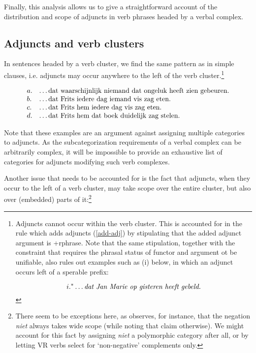 Finally, this analysis allows us to give a straightforward account of the
distribution and scope of adjuncts in verb phrases headed by a verbal complex.

\subsection{Adjuncts and verb clusters}

In sentences headed by a verb cluster, we find the same pattern as in simple 
clauses, i.e. adjuncts may occur anywhere to the left of the verb 
cluster.\footnote{Adjuncts cannot occur within the verb cluster. This is 
accounted for in the rule which adds adjuncts (\ref{add-adj}) by stipulating 
that the added adjunct argument is {\sc +rphrase}. Note that the same 
stipulation, together with the constraint that requires the phrasal status of 
functor and argument ot be unifiable, also rules out examples such as (i) 
below, in which an adjunct occurs left of a sperable prefix:


\[ i. ^*\ldots\mbox{\em dat Jan Marie op gisteren heeft gebeld.} \]
}


\begin{equation}
\begin{array}[t]{ll@{\hspace{0cm}}l}
a. && \ldots\mbox{dat waarschijnlijk niemand dat ongeluk heeft zien gebeuren.} 
\\
b. && \ldots\mbox{dat Frits iedere dag iemand vis zag eten.} \\
c. && \ldots\mbox{dat Frits hem iedere dag vis zag eten.} \\
d. && \ldots\mbox{dat Frits hem dat boek duidelijk zag stelen.} \\
\end{array} 
\end{equation}

\noindent Note that these examples are an argument against assigning multiple 
categories to adjuncts. As the subcategorization requirements of a verbal 
complex can be arbitrarily complex, it will be impossible to provide an 
exhaustive list of categories for adjuncts modifying such verb complexes. 

Another issue that needs to be accounted for is the fact that adjuncts, when 
they occur to the left of a verb cluster, may take scope over the entire 
cluster, but also over (embedded) parts of it:\footnote{
There seem to be exceptions here, as  observes, for 
instance, that the negation {\em niet} always takes wide scope (while noting 
that  claim otherwise). We might account for this fact by 
assigning {\em niet} a polymorphic category after all, or by letting VR verbs 
select for `non-negative' complements only.}

